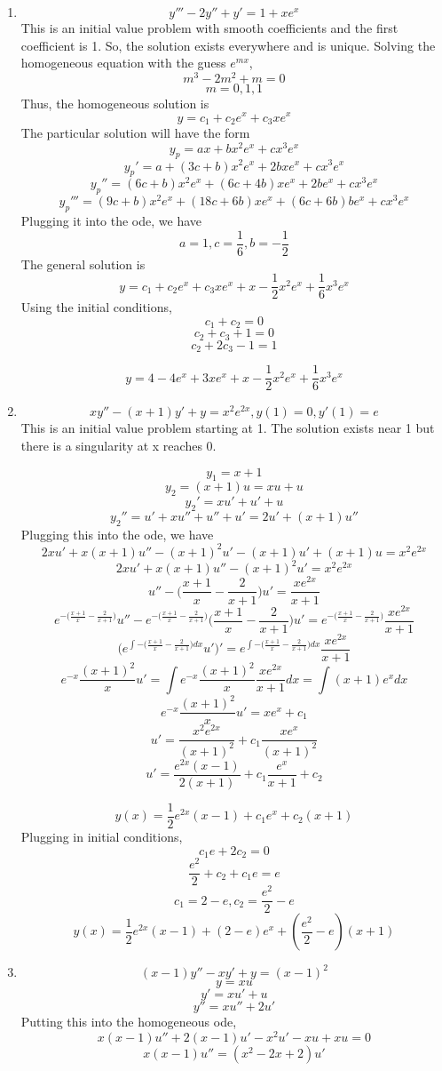 \documentclass[letterpaper,12pt]{article}
\begin{document}
\begin{enumerate}
\item

\[y''' -2y''+y'=1 +xe^x\]
This is an initial value problem with smooth coefficients and the first coefficient is 1. So, the solution exists everywhere and is unique.
Solving the homogeneous equation with the guess $e^{mx}$,
\[m^3-2m^2+m=0\]
\[m=0,1,1\]
Thus, the homogeneous solution is
\[y = c_1 +c_2 e^x + c_3 x e^x\]
The particular solution will have the form
\[y_p = a x + b x^2 e^x+c x^3e^x\]
\[y_p' = a  + (3c+b) x^2 e^x + 2bxe^x+c x^3e^x\]
\[y_p'' = (6c+b) x^2 e^x + (6c+4b)xe^x+2be^x+c x^3e^x\]
\[y_p''' =  (9c+b) x^2 e^x + (18c+6b)xe^x+(6c+6b)be^x+c x^3e^x\]
Plugging it into the ode, we have
\[a=1, c = \frac{1}{6}, b = -\frac{1}{2}\]
The general solution is
\[y = c_1 +c_2 e^x + c_3 x e^x+  x  -\frac{1}{2} x^2 e^x +\frac{1}{6} x^3e^x \]
Using the initial conditions,
\[c_1 + c_2 =0\]
\[c_2+c_3+1=0\]
\[c_2+2c_3-1=1\]

\[y = 4 -4 e^x + 3 x e^x+  x  -\frac{1}{2} x^2 e^x +\frac{1}{6} x^3e^x \]
\item
\[xy''- (x+1)y'+y=x^2e^{2x}, y(1)=0, y'(1)=e\]
This is an initial value problem starting at 1. The solution exists near 1 but there is a singularity at x reaches 0.

\[y_1 = x+1\]
\[y_2 = (x+1)u = x u +u\]
\[y_2' =  x u' +u'+u\]
\[y_2'' = u' +xu'' +u''+u'= 2u'+(x+1)u''\]
Plugging this into the ode, we have
\[2xu'+x(x+1)u''-(x+1)^2u'-(x+1)u'+(x+1)u=x^2e^{2x}\]
\[2xu'+x(x+1)u''-(x+1)^2u'=x^2e^{2x}\]
\[u''-\bigg(\frac{x+1}{x}-\frac{2}{x+1}\bigg)u'=\frac{xe^{2x}}{x+1}\]
\[e^{-\bigg(\frac{x+1}{x}-\frac{2}{x+1}\bigg)}u''-e^{-\bigg(\frac{x+1}{x}-\frac{2}{x+1}\bigg)}\bigg(\frac{x+1}{x}-\frac{2}{x+1}\bigg)u'=e^{-\bigg(\frac{x+1}{x}-\frac{2}{x+1}\bigg)}\frac{xe^{2x}}{x+1}\]
\[\bigg(e^{\int-\bigg(\frac{x+1}{x}-\frac{2}{x+1}\bigg)dx}u'\bigg)'=e^{\int-\bigg(\frac{x+1}{x}-\frac{2}{x+1}\bigg)dx}\frac{xe^{2x}}{x+1}\]
\[e^{-x}\frac{(x+1)^2}{x}u'= \int e^{-x}\frac{(x+1)^2}{x}\frac{xe^{2x}}{x+1} dx= \int (x+1)e^{x} dx  \]
\[e^{-x}\frac{(x+1)^2}{x}u'= xe^x+ c_1 \]
\[u'= \frac{x^2e^{2x}}{(x+1)^2}+ c_1 \frac{xe^{x}}{(x+1)^2} \]
\[u'= \frac{e^{2x}(x-1)}{2(x+1)}+c_1 \frac{e^x}{x+1}+c_2\]

\[y(x)= \frac{1}{2}e^{2x}(x-1) +c_1 e^x + c_2 (x+1)\]
 Plugging in initial conditions,
 \[c_1 e +2c_2=0\]
 \[\frac{e^2}{2}+c_2+c_1e=e\]
 \[c_1 = 2-e, c_2 =\frac{e^2}{2}-e\]
 \[y(x)= \frac{1}{2}e^{2x}(x-1) +(2-e) e^x + (\frac{e^2}{2}-e) (x+1)\]
 \item
 \[(x-1)y''-xy'+y=(x-1)^2\]
 \[y = x u\]
 \[y' = x u' + u\]
  \[y'' = x u'' + 2u'\]
	Putting this into the homogeneous ode,
	\[ x(x-1)u''+2(x-1)u'-x^2u'-xu+xu=0\]
		\[ x(x-1)u''=(x^2-2x+2)u'\]


\end{enumerate}
\end{document}
